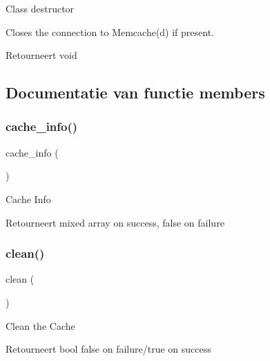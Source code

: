 Class destructor

Closes the connection to Memcache(d) if present.

\begin{DoxyReturn}{Retourneert}
void 
\end{DoxyReturn}


\subsection{Documentatie van functie members}
\mbox{\label{class_c_i___cache__memcached_acb4742926a6fa901e4f0917e1a35ef4c}} 
\subsubsection{\texorpdfstring{cache\_info()}{cache\_info()}}
{\footnotesize\ttfamily cache\+\_\+info (\begin{DoxyParamCaption}{ }\end{DoxyParamCaption})}

Cache Info

\begin{DoxyReturn}{Retourneert}
mixed array on success, false on failure 
\end{DoxyReturn}
\mbox{\label{class_c_i___cache__memcached_adb40b812890a8bc058bf6b7a0e1a54d9}} 
\subsubsection{\texorpdfstring{clean()}{clean()}}
{\footnotesize\ttfamily clean (\begin{DoxyParamCaption}{ }\end{DoxyParamCaption})}

Clean the Cache

\begin{DoxyReturn}{Retourneert}
bool false on failure/true on success 
\end{DoxyReturn}
\mbox{\label{class_c_i___cache__memcached_a4eb1c2772c8efc48c411ea060dd040b7}} 
